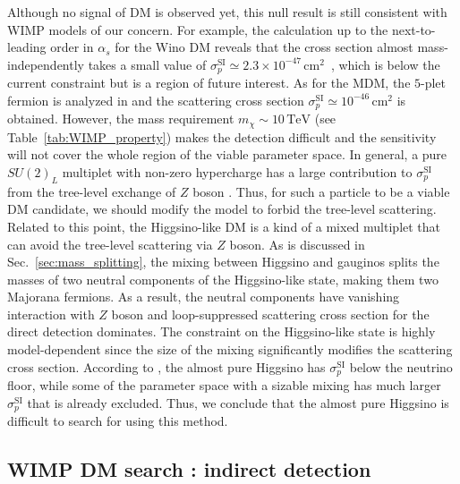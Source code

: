 \documentclass[12pt,twoside,book]{article}
\begin{document}
Although no signal of DM is observed yet, this null result is still consistent with WIMP models of our concern.
For example, the calculation up to the next-to-leading order in $\alpha_s$ for the Wino DM reveals that the cross section almost mass-independently takes a small value of $\sigma_p^{\mathrm{SI}} \simeq 2.3 \times 10^{-47}\,\mathrm{cm}^2$~\cite{Hisano:2015rsa}, which is below the current constraint but is a region of future interest.
As for the MDM, the $5$-plet fermion is analyzed in \cite{Hisano:2011cs} and the scattering cross section $\sigma_p^{\mathrm{SI}} \simeq 10^{-46}\,\mathrm{cm}^2$ is obtained.
However, the mass requirement $m_\chi \sim 10\,\mathrm{TeV}$ (see Table~\ref{tab:WIMP_property}) makes the detection difficult and the sensitivity will not cover the whole region of the viable parameter space.
In general, a pure $SU(2)_L$ multiplet with non-zero hypercharge has a large contribution to $\sigma_p^{\mathrm{SI}}$ from the tree-level exchange of $Z$ boson \cite{Farina:2013mla}.
Thus, for such a particle to be a viable DM candidate, we should modify the model to forbid the tree-level scattering.
Related to this point, the Higgsino-like DM is a kind of a mixed multiplet that can avoid the tree-level scattering via $Z$ boson.
As is discussed in Sec.~\ref{sec:mass_splitting}, the mixing between Higgsino and gauginos splits the masses of two neutral components of the Higgsino-like state, making them two Majorana fermions.
As a result, the neutral components have vanishing interaction with $Z$ boson and loop-suppressed scattering cross section for the direct detection dominates.
The constraint on the Higgsino-like state is highly model-dependent since the size of the mixing significantly modifies the scattering cross section.
According to \cite{Hisano:2012wm, Roszkowski:2014wqa}, the almost pure Higgsino has $\sigma_p^{\mathrm{SI}}$ below the neutrino floor, while some of the parameter space with a sizable mixing has much larger $\sigma_p^{\mathrm{SI}}$ that is already excluded.
Thus, we conclude that the almost pure Higgsino is difficult to search for using this method.


\subsection{WIMP DM search : indirect detection}
\label{sec:indirect_detection}
\end{document}

